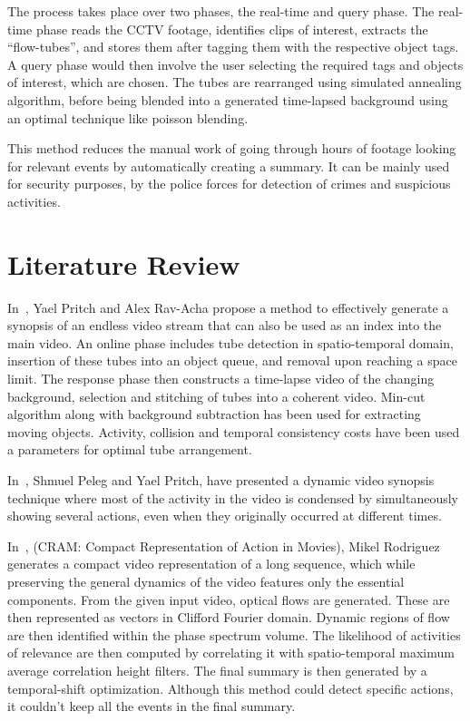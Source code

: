 \documentclass[conference]{IEEEtran}
\begin{document}
The process takes place over two phases, the real-time and query phase. The
real-time phase reads the CCTV footage, identifies clips of interest, extracts
the “flow-tubes”, and stores them after tagging them with the respective object
tags. A query phase would then involve the user selecting the required tags and
objects of interest, which are chosen. The tubes are rearranged using simulated
annealing algorithm, before being blended into a generated time-lapsed
background using an optimal technique like poisson blending.

This method reduces the manual work of going through hours of footage
looking for relevant events by automatically creating a summary. It can be
mainly used for security purposes, by the police forces for detection of crimes
and suspicious activities.


\section{Literature Review}

In~\cite{rav2006making}, Yael Pritch and Alex Rav-Acha propose a method to
effectively generate a synopsis of an endless video stream that can also be
used as an index into the main video. An online phase includes tube detection
in spatio-temporal domain, insertion of these tubes into an object queue, and
removal upon reaching a space limit. The response phase then constructs a
time-lapse video of the changing background, selection and stitching of tubes
into a coherent video. Min-cut algorithm along with background subtraction has
been used for extracting moving objects. Activity, collision and temporal
consistency costs have been used a parameters for optimal tube arrangement.

In~\cite{pritch2008nonchronological}, Shmuel Peleg and Yael Pritch, have
presented a dynamic video synopsis technique where most of the activity in the
video is condensed by simultaneously showing several actions, even when they
originally occurred at different times.

In~\cite{rodriguez2010cram}, (CRAM: Compact Representation of Action in Movies),
Mikel Rodriguez generates a compact video representation of a long sequence,
which while preserving the general dynamics of the video features only the
essential components. From the given input video, optical flows are generated.
These are then represented as vectors in Clifford Fourier domain. Dynamic
regions of flow are then identified within the phase spectrum volume. The
likelihood of activities of relevance are then computed by correlating it with
spatio-temporal maximum average correlation height filters. The final summary
is then generated by a temporal-shift optimization. Although this method could
detect specific actions, it couldn’t keep all the events in the final summary.
\end{document}
